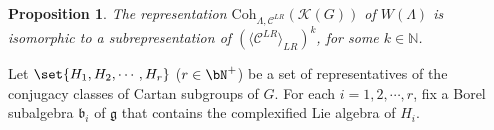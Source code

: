 \documentclass[12pt]{amsart}
\def\subset{\subseteq}
\newcommand{\BN}{{\mathbb {N}}}
\newcommand{\CC}{{\mathcal {C}}}
\newcommand{\CK}{{\mathcal {K}}}
\newcommand{\g}{\mathfrak g}
\renewcommand{\b}{\mathfrak b}
\newcommand{\la}{\langle}
\newcommand{\ra}{\rangle}
\numberwithin{equation}{section}
\newtheorem{prop}[thm]{Proposition}
\theoremstyle{remark}
\def\hha{{}^a\fhh}
\def\Coh{\mathrm{Coh}}
\newcommand{\Grt}{\cK}
\begin{document}
\begin{prop}\label{lem0033}
The representation $ \Coh_{\Lambda, \CC^{LR}}(\CK(G))$  of $W(\Lambda)$ is isomorphic to a subrepresentation of $(\la \CC^{LR}\ra_{LR})^k$, for some $k\in \BN$.
\end{prop}

Let $\set{H_1, H_2, \cdots, H_r}$ ($r\in \bN^+$) be a set of representatives of the
conjugacy classes of Cartan subgroups of $G$. For each $i=1,2,\cdots, r$,
fix a Borel subalgebra $\b_i$ of $\g$ that contains the complexified Lie algebra of $H_i$.
\end{document}
